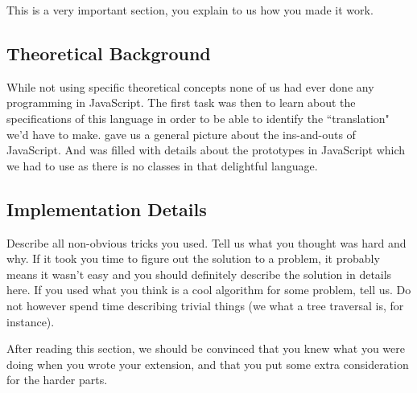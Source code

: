 This is a very important section, you explain to us how you made it work.

\subsection{Theoretical Background}
While not using specific theoretical concepts none of us had ever done any programming in JavaScript.
The first task was then to learn about the specifications of this language in order to be able to identify the ``translation" we'd have to make. \cite{JSGood} gave us a general picture about the ins-and-outs of JavaScript.
And \cite{JSProto} was filled with details about the prototypes in JavaScript which we had to use as there is no classes in that delightful language.

\subsection{Implementation Details}
Describe all non-obvious tricks you used. Tell us what you thought was hard and
why. If it took you time to figure out the solution to a problem, it probably
means it wasn't easy and you should definitely describe the solution in details
here. If you used what you think is a cool algorithm for some problem, tell us.
Do not however spend time describing trivial things (we what a tree traversal
is, for instance). 

After reading this section, we should be convinced that you knew what you were
doing when you wrote your extension, and that you put some extra consideration
for the harder parts.
